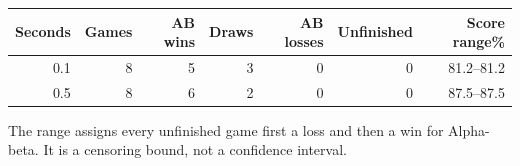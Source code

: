 \begin{center}\small\setlength{\tabcolsep}{4pt}
\begin{tabular}{rrrrrrr}\toprule
Seconds & Games & AB wins & Draws & AB losses & Unfinished & Score range\%\\\midrule
0.1 & 8 & 5 & 3 & 0 & 0 & 81.2--81.2 \\
0.5 & 8 & 6 & 2 & 0 & 0 & 87.5--87.5 \\
\bottomrule\end{tabular}\end{center}
The range assigns every unfinished game first a loss and then a win for Alpha-beta. It is a censoring bound, not a confidence interval.
